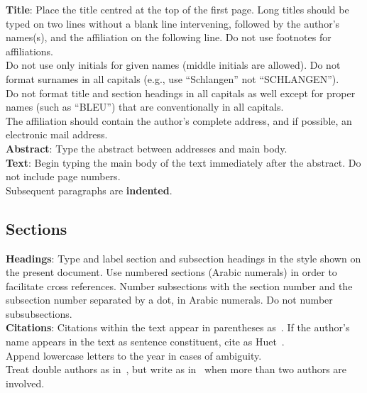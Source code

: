 \documentclass[11pt]{article}
\begin{document}
{\bf Title}: Place the title centred at the top of the first page.
Long titles should be typed on two lines without a blank line intervening,
followed by the
author's names(s), and the affiliation on the following line. 
Do not use footnotes for affiliations. \\

Do not
use only initials for given names (middle initials are allowed). Do
not format surnames in all capitals (e.g., use ``Schlangen'' not
``SCHLANGEN'').  \\

Do not format title and section headings in all
capitals as well except for proper names (such as ``BLEU'') that are
conventionally in all capitals.  \\

The affiliation should contain the
author's complete address, and if possible, an electronic mail
address. \\

{\bf Abstract}: Type the abstract between addresses and main body.\\

{\bf Text}: Begin typing the main body of the text immediately after
the abstract. Do not include page numbers.\\

Subsequent paragraphs are {\bf indented}.

\subsection{Sections}

{\bf Headings}: Type and label section and subsection headings in the
style shown on the present document.  Use numbered sections (Arabic
numerals) in order to facilitate cross references. Number subsections
with the section number and the subsection number separated by a dot,
in Arabic numerals. Do not number subsubsections.\\

{\bf Citations}: Citations within the text appear in parentheses
as~\cite{zen2}. If the author's name appears in the text as sentence constituent, cite as Huet~.\\

Append lowercase letters to the year in cases of ambiguity. \\

Treat double authors as in~\cite{scharf-hyman09}, but write as in~\cite{platform12} when more than two authors are involved. \\
\end{document}
